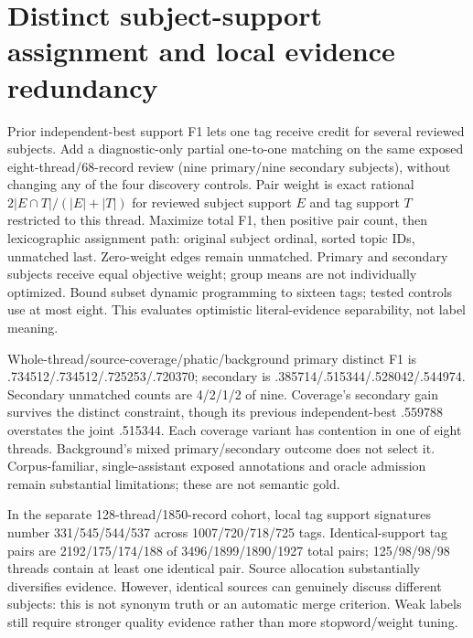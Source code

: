 \documentclass[11pt]{article}
\begin{document}
\section{Distinct subject-support assignment and local evidence redundancy}
Prior independent-best support F1 lets one tag receive credit for several reviewed
subjects. Add a diagnostic-only partial one-to-one matching on the same exposed
eight-thread/68-record review (nine primary/nine secondary subjects), without
changing any of the four discovery controls. Pair weight is exact rational
$2|E\cap T|/(|E|+|T|)$ for reviewed subject support $E$ and tag support $T$
restricted to this thread. Maximize total F1, then positive pair count, then
lexicographic assignment path: original subject ordinal, sorted topic IDs,
unmatched last. Zero-weight edges remain unmatched. Primary and secondary subjects
receive equal objective weight; group means are not individually optimized.
Bound subset dynamic programming to sixteen tags; tested controls use at most
eight. This evaluates optimistic literal-evidence separability, not label meaning.

Whole-thread/source-coverage/phatic/background primary distinct F1 is
.734512/.734512/.725253/.720370; secondary is
.385714/.515344/.528042/.544974. Secondary unmatched counts are 4/2/1/2 of nine.
Coverage's secondary gain survives the distinct constraint, though its previous
independent-best .559788 overstates the joint .515344. Each coverage variant has
contention in one of eight threads. Background's mixed primary/secondary outcome
does not select it. Corpus-familiar, single-assistant exposed annotations and
oracle admission remain substantial limitations; these are not semantic gold.

In the separate 128-thread/1850-record cohort, local tag support signatures
number 331/545/544/537 across 1007/720/718/725 tags. Identical-support tag pairs
are 2192/175/174/188 of 3496/1899/1890/1927 total pairs; 125/98/98/98 threads
contain at least one identical pair. Source allocation substantially diversifies
evidence. However, identical sources can genuinely discuss different subjects:
this is not synonym truth or an automatic merge criterion. Weak labels still
require stronger quality evidence rather than more stopword/weight tuning.
\end{document}
